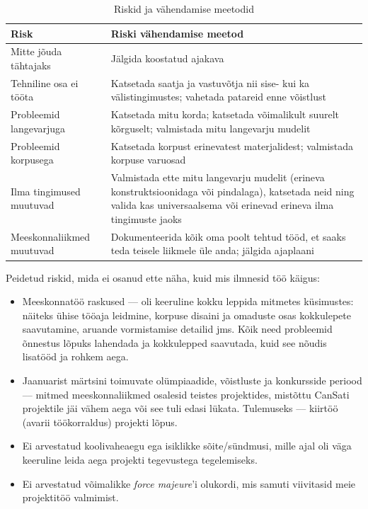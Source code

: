 \begin{table}[H]
    \centering
    \noindent\setlength\tabcolsep{4pt}%
    \begin{tabularx}{\linewidth}{|l|>{\RaggedRight\arraybackslash}X|}
        \hline
        \textbf{Risk} & \textbf{Riski vähendamise meetod}\\
        \hline
        \hline
        Mitte jõuda tähtajaks & Jälgida koostatud ajakava\\
        \hline
        Tehniline osa ei tööta & Katsetada saatja ja vastuvõtja nii sise- kui ka välistingimustes;
        vahetada patareid enne võistlust\\
        \hline
        Probleemid langevarjuga & Katsetada mitu korda; katsetada võimalikult suurelt kõrguselt; valmistada mitu langevarju mudelit\\
        \hline
        Probleemid korpusega & Katsetada korpust erinevatest materjalidest; valmistada korpuse varuosad\\
        \hline
        Ilma tingimused muutuvad & Valmistada ette mitu langevarju mudelit (erineva konstruktsioonidaga või pindalaga), katsetada neid ning valida kas universaalsema või erinevad erineva ilma tingimuste jaoks\\
        \hline
        Meeskonnaliikmed muutuvad & Dokumenteerida kõik oma poolt tehtud tööd, et saaks teda teisele liikmele üle anda; jälgida ajaplaani\\
        \hline
    \end{tabularx}
    \caption{Riskid ja vähendamise meetodid}
    \label{tab:4}
\end{table}

Peidetud riskid, mida ei osanud ette näha, kuid mis ilmnesid töö käigus:
\begin{itemize} 
    \item Meeskonnatöö raskused –-- oli keeruline kokku leppida mitmetes küsimustes: näiteks ühise tööaja leidmine, korpuse disaini ja omaduste osas kokkulepete saavutamine, aruande vormistamise detailid jms. Kõik need probleemid õnnestus lõpuks lahendada ja kokkulepped saavutada, kuid see nõudis lisatööd ja rohkem aega.
    \item Jaanuarist märtsini toimuvate olümpiaadide, võistluste ja konkursside periood –-- mitmed meeskonnaliikmed osalesid teistes projektides, mistõttu CanSati projektile jäi vähem aega või see tuli edasi lükata. Tulemuseks –-- kiirtöö (avarii töökorraldus) projekti lõpus.
    \item Ei arvestatud koolivaheaegu ega isiklikke sõite/sündmusi, mille ajal oli väga keeruline leida aega projekti tegevustega tegelemiseks.
    \item Ei arvestatud võimalikke \textit{force majeure}’i olukordi, mis samuti viivitasid meie projektitöö valmimist.
\end{itemize}

